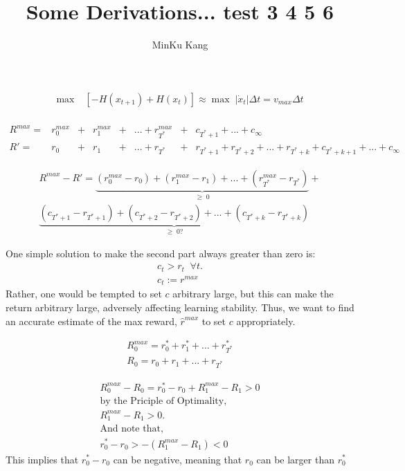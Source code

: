 \documentclass[12pt]{article}
\begin{document}
 
  
\title{Some Derivations... test  3 4 5 6}

\author{MinKu Kang}
 
\maketitle

\begin{align}
\max \; &\left[ - H(x_{t+1}) + H(x_{t}) \right] \approx 
\max \; | \dot{x}_t  | \Delta t = v_{max} \Delta t \\
\end{align}

\begin{align*}
R^{max} = &r_0^{max} &+ &r_1^{max} &+& ...  + r_{T^*}^{max} &+ &c_{T^{*}+1} + ... + c_{\infty} \\
R' = &r_0 &+ &r_1 &+& ... + r_{T^*} &+ &r_{T^{*}+1} + r_{T^{*}+2} + ... + r_{T^{*}+k} + c_{T^{*}+k+1} + ... + c_{\infty}  
\end{align*}

\begin{align*}
R^{max} - R' = \underbrace{(r_0^{max} - r_0) + (r_1^{max} - r_1) + ... + (r_{T^*}^{max} - r_{T^*})}_{\geq \; 0} + \\
\underbrace{(c_{T^{*}+1} - r_{T^{*}+1}) + (c_{T^{*}+2} - r_{T^{*}+2}) + ... + (c_{T^{*}+k} - r_{T^{*}+k})}_{\geq \; 0 ? }
\end{align*}

One simple solution to make the second part always greater than zero is:
\begin{align*}
c_t > r_t \;\; \forall t. \\
c_t := r^{max}
\end{align*}
Rather, one would be tempted to set $c$ arbitrary large, but this can make the return arbitrary large, adversely affecting learning stability. Thus, we want to find an accurate estimate of the max reward, $\hat{r}^{max}$ to set $c$ appropriately.

\begin{align*}
R_0^{max} = r_0^* + r_1^* + ... + r_{T^*}^* \\
R_0 = r_0 + r_1 + ... + r_{T^*}
\end{align*}

\begin{align*}
R_0^{max} - R_0 = r_0^* - r_0 + R_1^{max} - R_1 > 0 \\
\text{by the Priciple of Optimality,} \\
R_1^{max} - R_1 > 0. \\
\text{And note that,} \\
r_0^* - r_0 > - (R_1^{max} - R_1) < 0 
\end{align*}
This implies that $r_0^* - r_0$ can be negative, meaning that $r_0$ can be larger than $r_0^*$ 
\end{document}
